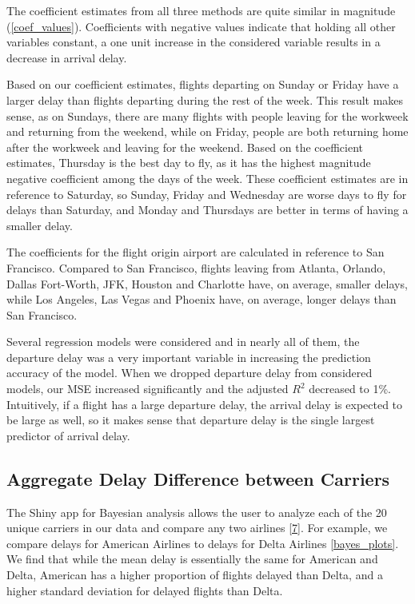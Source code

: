 \documentclass{article} %
\begin{document}
The coefficient estimates from all three methods are quite similar in magnitude (\autoref{coef_values}). Coefficients with negative values indicate that holding all other variables constant, a one unit increase in the considered variable results in a decrease in arrival delay.  

Based on our coefficient estimates, flights departing on Sunday or Friday have a larger delay than flights departing during the rest of the week. This result makes sense, as on Sundays, there are many flights with people leaving for the workweek and returning from the weekend, while on Friday, people are both returning home after the workweek and leaving for the weekend. Based on the coefficient estimates, Thursday is the best day to fly, as it has the highest magnitude negative coefficient among the days of the week. These coefficient estimates are in reference to Saturday, so Sunday, Friday and Wednesday are worse days to fly for delays than Saturday, and Monday and Thursdays are better in terms of having a smaller delay.

The coefficients for the flight origin airport are calculated in reference to San Francisco. Compared to San Francisco, flights leaving from Atlanta, Orlando, Dallas Fort-Worth, JFK, Houston and Charlotte have, on average, smaller delays, while Los Angeles, Las Vegas and Phoenix have, on average, longer delays than San Francisco.  

Several regression models were considered and in nearly all of them, the departure delay was a very important variable in increasing the prediction accuracy of the model. When we dropped departure delay from considered models, our MSE increased significantly and the adjusted $R^2$ decreased to 1\%. Intuitively, if a flight has a large departure delay, the arrival delay is expected to be large as well, so it makes sense that departure delay is the single largest predictor of arrival delay.

\subsection{Aggregate Delay Difference between Carriers}

The Shiny app for Bayesian analysis allows the user to analyze each of the 20 unique carriers in our data and compare any two airlines \hyperlink{Ref7}{[7]}. For example, we compare delays for American Airlines to delays for Delta Airlines \autoref{bayes_plots}. We find that while the mean delay is essentially the same for American and Delta, American has a higher proportion of flights delayed than Delta, and a higher standard deviation for delayed flights than Delta.  
\end{document}
